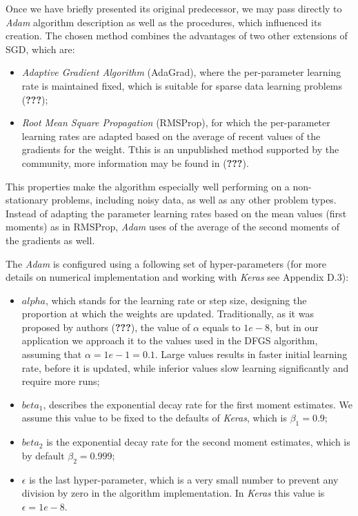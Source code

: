 \documentclass[11pt,]{article}
\providecommand{\tightlist}{%
  \setlength{\itemsep}{0pt}\setlength{\parskip}{0pt}}
\begin{document}
Once we have briefly presented its original predecessor, we may pass
directly to \emph{Adam} algorithm description as well as the procedures,
which influenced its creation. The chosen method combines the advantages
of two other extensions of SGD, which are:

\begin{itemize}
\tightlist
\item
  \emph{Adaptive Gradient Algorithm} (AdaGrad), where the per-parameter
  learning rate is maintained fixed, which is suitable for sparse data
  learning problems ({\textbf{???}});
\item
  \emph{Root Mean Square Propagation} (RMSProp), for which the
  per-parameter learning rates are adapted based on the average of
  recent values of the gradients for the weight. Tthis is an unpublished
  method supported by the community, more information may be found in
  ({\textbf{???}}).
\end{itemize}

This properties make the algorithm especially well performing on a
non-stationary problems, including noisy data, as well as any other
problem types. Instead of adapting the parameter learning rates based on
the mean values (first moments) as in RMSProp, \emph{Adam} uses of the
average of the second moments of the gradients as well.

The \emph{Adam} is configured using a following set of hyper-parameters
(for more details on numerical implementation and working with
\emph{Keras} see Appendix D.3):

\begin{itemize}
\tightlist
\item
  \(alpha\), which stands for the learning rate or step size, designing
  the proportion at which the weights are updated. Traditionally, as it
  was proposed by authors ({\textbf{???}}), the value of \(\alpha\)
  equals to \(1e-8\), but in our application we approach it to the
  values used in the DFGS algorithm, assuming that
  \(\alpha = 1e-1 = 0.1\). Large values results in faster initial
  learning rate, before it is updated, while inferior values slow
  learning significantly and require more runs;
\item
  \(beta_1\), describes the exponential decay rate for the first moment
  estimates. We assume this value to be fixed to the defaults of
  \emph{Keras}, which is \(\beta_1 = 0.9\);
\item
  \(beta_2\) is the exponential decay rate for the second moment
  estimates, which is by default \(\beta_2 = 0.999\);
\item
  \(\epsilon\) is the last hyper-parameter, which is a very small number
  to prevent any division by zero in the algorithm implementation. In
  \emph{Keras} this value is \(\epsilon = 1e-8\).
\end{itemize}
\end{document}
